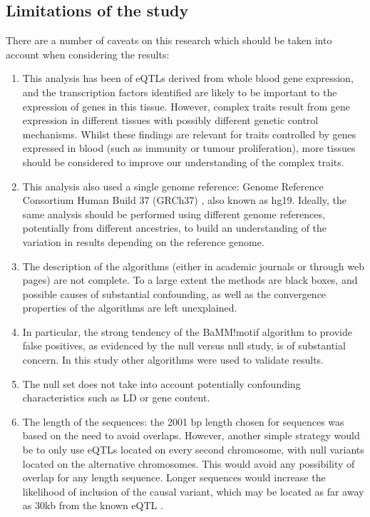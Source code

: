 \documentclass[12pt]{article}
\begin{document}
\subsection{Limitations of the study}
There are a number of caveats on this research which should be taken into account when considering the results:
\begin{enumerate}
\item This analysis has been of eQTLs derived from whole blood gene expression, and the transcription factors identified are likely to be important to the expression of genes in this tissue. However, complex traits result from gene expression in different tissues with possibly different genetic control mechanisms. Whilst these findings are relevant for traits controlled by genes expressed in blood (such as immunity or tumour proliferation), more tissues should be considered to improve our understanding of the complex traits.
\item This analysis also used a single genome reference: Genome Reference Consortium Human Build 37 (GRCh37) \citep{Lander2001}, also known as hg19. Ideally, the same analysis should be performed using different genome references, potentially from different ancestries, to build an understanding of the variation in results depending on the reference genome.
\item The description of the algorithms (either in academic journals or through web pages) are not complete. To a large extent the methods are black boxes, and possible causes of substantial confounding, as well as the convergence properties of the algorithms are left unexplained.
\item In particular, the strong tendency of the BaMM!motif algorithm to provide false positives, as evidenced by the null versus null study, is of substantial concern. In this study other algorithms were used to validate results.
\item The null set does not take into account potentially confounding characteristics such as LD or gene content. 
\item The length of the sequences: the 2001 bp length chosen for sequences was based on the need to avoid overlaps. However, another simple strategy would be to only use eQTLs located on every second chromosome, with null variants located on the alternative chromosomes. This would avoid any possibility of overlap for any length sequence. Longer sequences would increase the likelihood of inclusion of the causal variant, which may be located as far away as 30kb from the known eQTL \citep{wu2018integrative}.

\end{enumerate}
\end{document}
